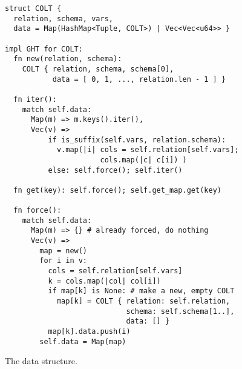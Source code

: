 

\begin{figure}
  \begin{lstlisting}
struct COLT {
  relation, schema, vars, 
  data = Map(HashMap<Tuple, COLT>) | Vec<Vec<u64>> }

impl GHT for COLT:
  fn new(relation, schema):
    COLT { relation, schema, schema[0],
           data = [ 0, 1, ..., relation.len - 1 ] }

  fn iter():
    match self.data:
      Map(m) => m.keys().iter(),
      Vec(v) => 
          if is_suffix(self.vars, relation.schema):
            v.map(|i| cols = self.relation[self.vars];
                      cols.map(|c| c[i]) )
          else: self.force(); self.iter()

  fn get(key): self.force(); self.get_map.get(key)

  fn force():
    match self.data:
      Map(m) => {} # already forced, do nothing
      Vec(v) => 
        map = new()
        for i in v:
          cols = self.relation[self.vars]
          k = cols.map(|col| col[i])
          if map[k] is None: # make a new, empty COLT
            map[k] = COLT { relation: self.relation, 
                            schema: self.schema[1..], 
                            data: [] }
          map[k].data.push(i)
        self.data = Map(map)
\end{lstlisting}
  \caption{The \COLT data structure.}
  \label{fig:colt-impl}
\end{figure}


